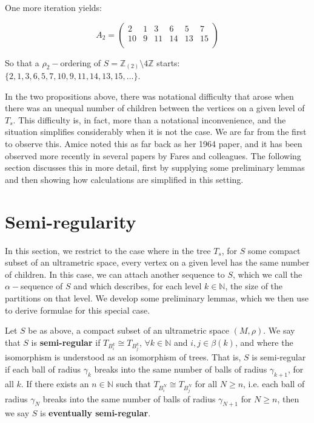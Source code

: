 \begin{example}
One more iteration yields:

\[A_2=
 \begin{pmatrix}
2 & 1 & 3 & 6 & 5 & 7 \\
10 & 9 & 11 & 14 & 13 & 15   \\
\end{pmatrix}
\]

So that a $\rho_2-$ordering of $S=\mathbb{Z}_{(2)} \setminus 4\mathbb{Z}$ starts: $\{2,1,3,6,5,7,10,9,11,14,13,15,\ldots\}$.

\end{example}


In the two propositions above, there was notational difficulty that arose when there was an unequal number of children between the vertices on a given level of $T_s$. This difficulty is, in fact, more than a notational inconvenience, and the situation simplifies considerably when it is not the case. We are far from the first to observe this. Amice noted this as far back as her 1964 paper, and it has been observed more recently in several papers by Fares and colleagues. The following section discusses this in more detail, first by supplying some preliminary lemmas and then showing how calculations are simplified in this setting.

\section*{Semi-regularity}
In this section, we restrict to the case where in the tree $T_s$, for $S$ some compact subset of an ultrametric space, every vertex on a given level has the same number of children. In this case, we can attach another sequence to $S$, which we call the $\alpha-$sequence of $S$ and which describes, for each level $k \in \mathbb{N}$, the size of the partitions on that level. We develop some preliminary lemmas, which we then use to derive formulae for this special case.

\begin{definition*}
Let $S$ be as above, a compact subset of an ultrametric space $(M, \rho)$. We say that $S$ is \textbf{semi-regular} if $T_{B^k_i} \cong T_{B^k_j}$, $\forall k \in \mathbb{N}$ and  $i,j \in \beta(k)$, and where the isomorphism is understood as an isomorphism of trees. That is, $S$ is semi-regular if each ball of radius $\gamma_k$ breaks into the same number of balls of radius $\gamma_{k+1}$, for all $k$. If there exists an $n \in \mathbb{N}$ such that $T_{B^N_i} \cong T_{B^N_j}$ for all $N \geq n$, i.e.  each ball of radius $\gamma_N$ breaks into the same number of balls of radius $\gamma_{N+1}$ for $N \geq n$, then we say $S$ is \textbf{eventually semi-regular}.
\end{definition*}

